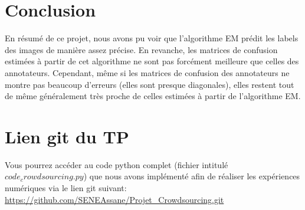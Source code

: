 \documentclass[a4paper,french,10pt]{article}
\begin{document}
	\section{Conclusion}
	En résumé de ce projet, nous avons pu voir que l'algorithme EM prédit les labels des images de manière assez précise. En revanche, les matrices de confusion estimées à partir de cet algorithme ne sont pas forcément meilleure que celles des annotateurs. 
	Cependant, même si les matrices de confusion des annotateurs ne montre pas beaucoup d'erreurs (elles sont presque diagonales), elles restent tout de même généralement très proche de celles estimées à partir de l'algorithme EM.
	
	\section{Lien git du TP}
	Vous pourrez accéder au code python complet (fichier intitulé $code_crowdsourcing.py$) que nous avons implémenté afin de réaliser les expériences numériques via le lien git suivant:\\
	\url{https://github.com/SENEAssane/Projet_Crowdsourcing.git}
	
\end{document}
